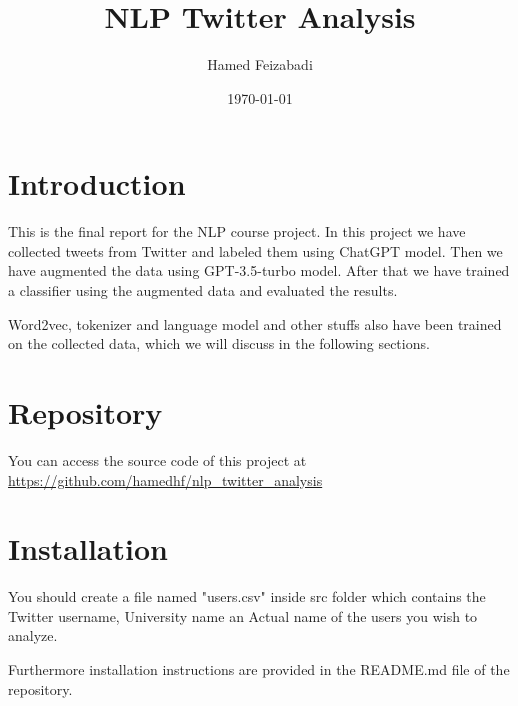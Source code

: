 \documentclass[12pt, letterpaper]{article}
\title{NLP Twitter Analysis}
\author{Hamed Feizabadi}
\date{\today}
\begin{document}
    \maketitle
    \tableofcontents
    \newpage


    \section{Introduction}\label{sec:introduction}
    This is the final report for the NLP course project. In this project we have collected tweets from Twitter and labeled them using ChatGPT model. Then we have augmented the data using GPT-3.5-turbo model. After that we have trained a classifier using the augmented data and evaluated the results.

    Word2vec, tokenizer and language model and other stuffs also have been trained on the collected data, which we will discuss in the following sections.


    \section{Repository}\label{sec:repository}
    You can access the source code of this project at \url{https://github.com/hamedhf/nlp_twitter_analysis}


    \section{Installation}\label{sec:installation}
    You should create a file named "users.csv" inside src folder which contains the Twitter username, University name an Actual name of the users you wish to analyze.

    Furthermore installation instructions are provided in the README.md file of the repository.
\end{document}
